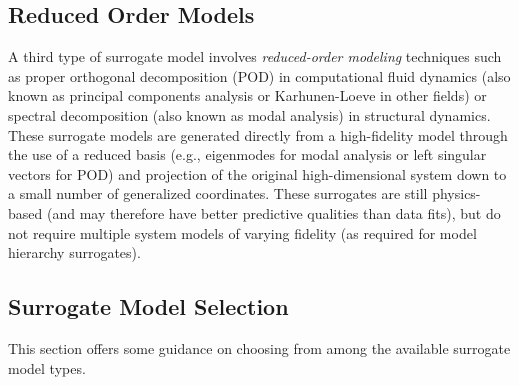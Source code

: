 \subsection{Reduced Order Models} \label{models:surrogate:rom}

A third type of surrogate model involves {\em reduced-order modeling}
techniques such as proper orthogonal decomposition (POD) in
computational fluid dynamics (also known as principal components
analysis or Karhunen-Loeve in other fields) or spectral decomposition
(also known as modal analysis) in structural dynamics.  These
surrogate models are generated directly from a high-fidelity model
through the use of a reduced basis (e.g., eigenmodes for modal
analysis or left singular vectors for POD) and projection of the
original high-dimensional system down to a small number of generalized
coordinates.  These surrogates are still physics-based (and may
therefore have better predictive qualities than data fits), but do not
require multiple system models of varying fidelity (as required for
model hierarchy surrogates).

\subsection{Surrogate Model Selection}

This section offers some guidance on choosing from among the available
surrogate model types.

